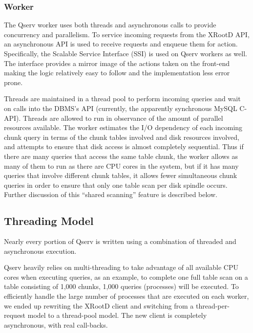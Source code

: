\documentclass[DM,toc]{lsstdoc}
\begin{document}
\subsubsection{Worker}\label{worker}

The Qserv worker uses both threads and asynchronous calls to provide
concurrency and parallelism. To service incoming requests from the
XRootD API, an asynchronous API is used to
receive requests and enqueue them for action. Specifically, the Scalable
Service Interface (SSI) is used on Qserv workers as well. The
interface provides a mirror image of the actions taken on the front-end
making the logic relatively easy to follow and the implementation less
error prone.

Threads are maintained in a thread pool to perform incoming queries and
wait on calls into the DBMS's API (currently, the apparently synchronous
MySQL C-API). Threads are allowed to run in observance of the amount of
parallel resources available. The worker estimates the I/O dependency of
each incoming chunk query in terms of the chunk tables involved and disk
resources involved, and attempts to ensure that disk access is almost
completely sequential. Thus if there are many queries that access the
same table chunk, the worker allows as many of them to run as there are
CPU cores in the system, but if it has many queries that involve
different chunk tables, it allows fewer simultaneous chunk queries in
order to ensure that only one table scan per disk spindle occurs.
Further discussion of this ``shared scanning'' feature is described below.

\subsection{Threading Model}\label{threading-model}

Nearly every portion of Qserv is written using a combination of threaded
and asynchronous execution.

Qserv heavily relies on multi-threading to take advantage of all available CPU
cores when executing queries, as an example, to complete one full table scan
on a table consisting of 1,000 chunks, 1,000 queries (processes) will be
executed. To efficiently handle the large number of processes that are
executed on each worker, we ended up rewriting the XRootD client and switching
from a thread-per-request model to a thread-pool model. The new client is
completely asynchronous, with real call-backs.
\end{document}
